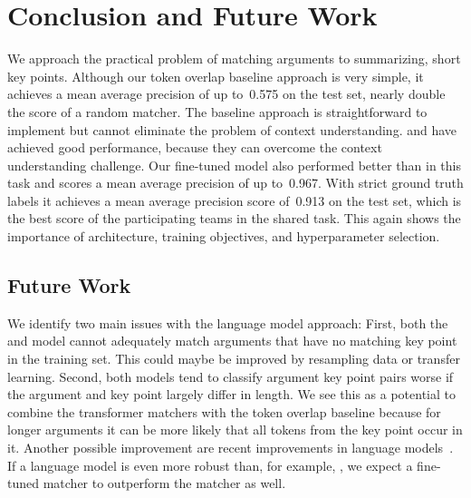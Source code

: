 \section{Conclusion and Future Work}\label{conclusion}

We approach the practical problem of matching arguments to summarizing, short key points.
Although our token overlap baseline approach is very simple, it achieves a mean average precision of up to~0.575 on 
the test set, nearly double the score of a random matcher. 
The baseline approach is straightforward to implement but cannot eliminate the problem of context understanding. 
\RobertaBase and \BertBase have achieved good performance, because they can overcome the context understanding challenge. 
Our fine-tuned \RobertaBase model also performed better than \BertBase in this task and scores a mean average 
precision of up to~0.967.
With strict ground truth labels it achieves a mean average precision score of~0.913 on the test set, which is the best 
score of the participating teams in the shared task.
This again shows the importance of architecture, training objectives, and hyperparameter selection.

\subsection{Future Work}

We identify two main issues with the language model approach:
First, both the \BertBase and \RobertaBase model cannot adequately match arguments that have no matching key point in the training set.
This could maybe be improved by resampling data or transfer learning.
Second, both models tend to classify argument key point pairs worse if the argument and key point largely differ in length.
We see this as a potential to combine the transformer matchers with the token overlap baseline because for longer arguments 
it can be more likely that all tokens from the key point occur in it.
Another possible improvement are recent improvements in language models~\cite{Sun2021WFDPSLCZLLWGLSSLOYTWW}.
If a language model is even more robust than, for example, \Roberta, we expect a fine-tuned matcher to outperform 
the \RobertaBase matcher as well.
